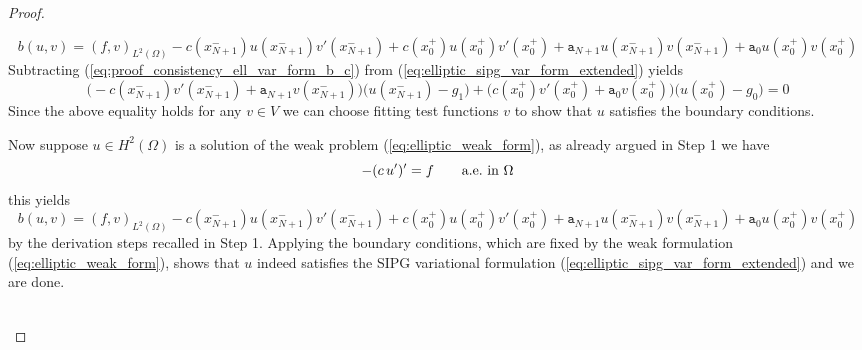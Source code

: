 \begin{proof}
\begin{proofstep}["$\Leftarrow$"]
		\begin{equation}
			\label{eq:proof_consistency_ell_var_form_b_c}
			b(u,v) = (f,v)_{L^2(\Omega)} - c(x_{N+1}^-)u(x_{N+1}^-)v'(x_{N+1}^-) + c(x_{0}^+)u(x_{0}^+)v'(x_{0}^+) 
			+ \texttt{a}_{N+1}u(x_{N+1}^-)v(x_{N+1}^-) + \texttt{a}_0 u(x_{0}^+)v(x_{0}^+)
		\end{equation}
		Subtracting (\ref{eq:proof_consistency_ell_var_form_b_c}) from (\ref{eq:elliptic_sipg_var_form_extended}) yields
		\begin{equation*}
			\Big(-c(x_{N+1}^-)v'(x_{N+1}^-) + \texttt{a}_{N+1}v(x_{N+1}^-)\Big)\Big(u(x_{N+1}^-) - g_1\Big) 
			+ \Big(c(x_{0}^+)v'(x_{0}^+) + \texttt{a}_{0}v(x_{0}^+)\Big)\Big(u(x_{0}^+) - g_0\Big) = 0
		\end{equation*}
		Since the above equality holds for any $v \in V$ we can choose fitting test functions $v$ to show that $u$ satisfies the boundary conditions.
	\end{proofstep}
	\begin{proofstep}
		\noindent Now suppose $u \in H^2(\Omega) $ is a solution of the weak problem (\ref{eq:elliptic_weak_form}), as already argued in Step 1 we have 
		\begin{equation}
			-(c\, u')' = f \qquad \text{a.e.\@ in } \Omega  \nonumber
		\end{equation}
		this yields 
		\begin{equation}
			b(u,v) = (f,v)_{L^2(\Omega)} - c(x_{N+1}^-)u(x_{N+1}^-)v'(x_{N+1}^-) + c(x_{0}^+)u(x_{0}^+)v'(x_{0}^+) 
			+ \texttt{a}_{N+1}u(x_{N+1}^-)v(x_{N+1}^-) + \texttt{a}_0 u(x_{0}^+)v(x_{0}^+) \nonumber
		\end{equation}
		by the derivation steps recalled in Step 1. Applying the boundary conditions, which are fixed by the weak formulation (\ref{eq:elliptic_weak_form}), shows
		that $u$ indeed satisfies the SIPG variational formulation
		(\ref{eq:elliptic_sipg_var_form_extended}) and we are done. \\ \\
	\end{proofstep}
\end{proof}

